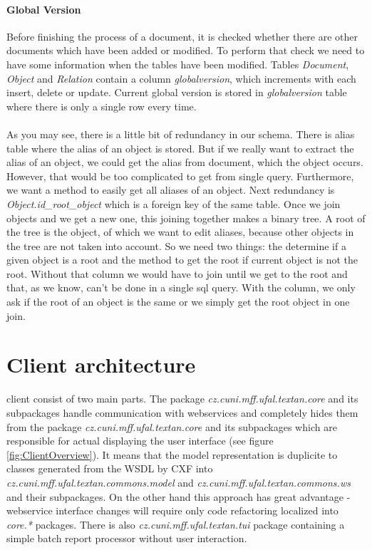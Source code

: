\paragraph{Global Version} Before finishing the process of a document, it is checked whether there
are other documents which have been added or modified. To perform that check we need to have some information
when the tables have been modified. Tables \emph{Document}, \emph{Object} and \emph{Relation} 
contain a column \emph{globalversion}, which increments with each insert, delete or update. 
Current global version is stored in \emph{globalversion} table where there is only a single row every time.

\paragraph{} As you may see, there is a little bit of redundancy in our schema. There is alias table where the alias of an object is stored. But if we really want to extract the alias of an object, we could get the alias from document, which the object occurs. However, that would be too complicated to get from single query. Furthermore, we want a method to easily get all aliases of an object.
Next redundancy is \emph{Object.id\_{}root\_{}object} which is a foreign key of the same table. Once we join objects and we get a new one, this joining together makes a binary tree. A root of the tree is the object, of which we want to edit aliases, because other objects in the tree are not taken into account. So we need two things: the determine if a given object is a root and the method to get the root if current object is not the root. Without that column we would have to join until we get to the root and that, as we know, can't be done in a single sql query. With the column, we only ask if the root of an object is the same or we simply get the root object in one join.

\section{Client architecture}



\textan{} client consist of two main parts. The package
\emph{cz.cuni.mff.ufal.textan.core} and its subpackages handle communication
with webservices and completely hides them from the package
\emph{cz.cuni.mff.ufal.textan.core} and its subpackages which are responsible
for actual displaying the user interface (see figure \ref{fig:ClientOverview}).
It means that the model representation is duplicite to classes generated from
the WSDL by CXF into \emph{cz.\-cuni.\-mff.\-ufal.\-textan.\-commons.\-model}
and \emph{cz.\-cuni.\-mff.\-ufal.\-textan.\-commons.\-ws} and their subpackages.
On the other hand this approach has great advantage - webservice interface
changes will require only code refactoring localized into \emph{core.*}
packages. There is also \emph{cz.\-cuni.\-mff.\-ufal.\-textan.\-tui} package
containing a simple batch report processor without user interaction.

